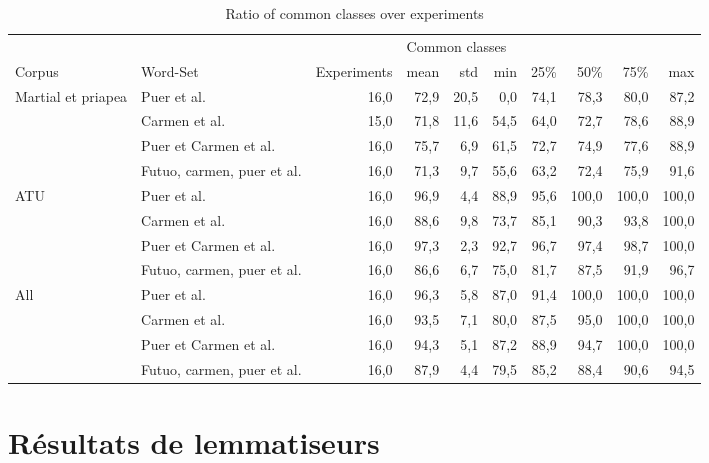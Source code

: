 \begin{table}
    \centering
\begin{adjustbox}{width=\textwidth}
\begin{tabular}{ll|r|rr|rrrrr}
\toprule
    &                            & & \multicolumn{7}{l}{Common classes} \\
Corpus & Word-Set  &         Experiments & mean &  std &  min &   25\% &   50\% &   75\% &   max \\
\midrule
Martial et priapea & Puer et al. &          16,0 & 72,9 & 20,5 &  0,0 & 74,1 &  78,3 &  80,0 &  87,2 \\
    & Carmen et al. &          15,0 & 71,8 & 11,6 & 54,5 & 64,0 &  72,7 &  78,6 &  88,9 \\
    & Puer et Carmen et al. &          16,0 & 75,7 &  6,9 & 61,5 & 72,7 &  74,9 &  77,6 &  88,9 \\
    & Futuo, carmen, puer et al. &          16,0 & 71,3 &  9,7 & 55,6 & 63,2 &  72,4 &  75,9 &  91,6 \\
ATU & Puer et al. &          16,0 & 96,9 &  4,4 & 88,9 & 95,6 & 100,0 & 100,0 & 100,0 \\
    & Carmen et al. &          16,0 & 88,6 &  9,8 & 73,7 & 85,1 &  90,3 &  93,8 & 100,0 \\
    & Puer et Carmen et al. &          16,0 & 97,3 &  2,3 & 92,7 & 96,7 &  97,4 &  98,7 & 100,0 \\
    & Futuo, carmen, puer et al. &          16,0 & 86,6 &  6,7 & 75,0 & 81,7 &  87,5 &  91,9 &  96,7 \\
All & Puer et al. &          16,0 & 96,3 &  5,8 & 87,0 & 91,4 & 100,0 & 100,0 & 100,0 \\
    & Carmen et al. &          16,0 & 93,5 &  7,1 & 80,0 & 87,5 &  95,0 & 100,0 & 100,0 \\
    & Puer et Carmen et al. &          16,0 & 94,3 &  5,1 & 87,2 & 88,9 &  94,7 & 100,0 & 100,0 \\
    & Futuo, carmen, puer et al. &          16,0 & 87,9 &  4,4 & 79,5 & 85,2 &  88,4 &  90,6 &  94,5 \\
\bottomrule
\end{tabular}
\end{adjustbox}
    \caption{Ratio of common classes over experiments}
    \label{tab:anx:noise:capitains:ratio_classes}
\end{table}

\section*{Résultats de lemmatiseurs}


